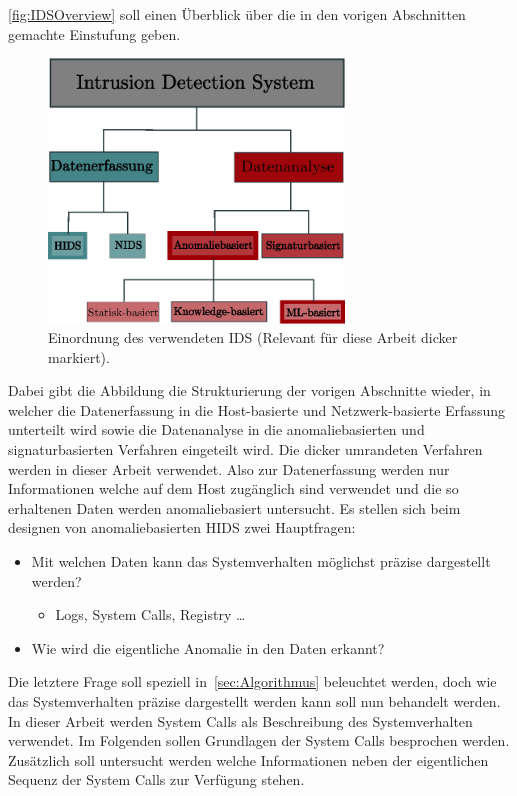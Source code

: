                 \autoref{fig:IDSOverview} soll einen Überblick über die in den vorigen Abschnitten gemachte Einstufung geben.
                \begin{figure}[ht]
                    \centering
                    \includegraphics[width=0.7\textwidth]{images/Illustrationen/IDS/IDSOverview}
                    \caption[ass]{Einordnung des verwendeten \ac{IDS} (Relevant für diese Arbeit dicker markiert).}\label{fig:IDSOverview}
                \end{figure}
                Dabei gibt die Abbildung die Strukturierung der vorigen Abschnitte wieder,
                in welcher die Datenerfassung in die Host-basierte und Netzwerk-basierte Erfassung unterteilt wird sowie die Datenanalyse
                in die anomaliebasierten und signaturbasierten Verfahren eingeteilt wird.
                Die dicker umrandeten Verfahren werden in dieser Arbeit verwendet.
                Also zur Datenerfassung werden nur Informationen welche auf dem Host zugänglich sind verwendet 
                und die so erhaltenen Daten werden anomaliebasiert untersucht.
                Es stellen sich beim designen von anomaliebasierten \ac{HIDS} zwei Hauptfragen:
                \begin{itemize}
                    \item Mit welchen Daten kann das Systemverhalten möglichst präzise dargestellt werden?
                        \begin{itemize}
                            \item Logs, System Calls, Registry \dots~\cite{HIDSSURVEY2019bridges}
                        \end{itemize}
                    \item Wie wird die eigentliche Anomalie in den Daten erkannt?
                \end{itemize}
                Die letztere Frage soll speziell in~\autoref{sec:Algorithmus} beleuchtet werden, doch wie das Systemverhalten präzise dargestellt werden kann soll nun behandelt werden.
                In dieser Arbeit werden System Calls als Beschreibung des Systemverhalten verwendet.
                Im Folgenden sollen Grundlagen der System Calls besprochen werden.
                Zusätzlich soll untersucht werden welche Informationen neben der eigentlichen Sequenz der System Calls zur Verfügung stehen.

